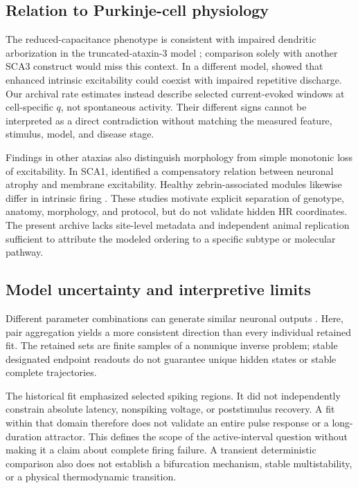 \documentclass[utf8]{FrontiersinHarvard}
\begin{document}
\subsection{Relation to Purkinje-cell physiology}
The reduced-capacitance phenotype is consistent with impaired dendritic arborization in the truncated-ataxin-3 model \citep{konno2014}; comparison solely with another SCA3 construct would miss this context. In a different model, \citet{shakkottai2011} showed that enhanced intrinsic excitability could coexist with impaired repetitive discharge. Our archival rate estimates instead describe selected current-evoked windows at cell-specific $q$, not spontaneous activity. Their different signs cannot be interpreted as a direct contradiction without matching the measured feature, stimulus, model, and disease stage.

Findings in other ataxias also distinguish morphology from simple monotonic loss of excitability. In SCA1, \citet{dellorco2015} identified a compensatory relation between neuronal atrophy and membrane excitability. Healthy zebrin-associated modules likewise differ in intrinsic firing \citep{zhou2014}. These studies motivate explicit separation of genotype, anatomy, morphology, and protocol, but do not validate hidden HR coordinates. The present archive lacks site-level metadata and independent animal replication sufficient to attribute the modeled ordering to a specific subtype or molecular pathway.

\subsection{Model uncertainty and interpretive limits}
Different parameter combinations can generate similar neuronal outputs \citep{prinz2004,achard2006,taylor2009}. Here, pair aggregation yields a more consistent direction than every individual retained fit. The retained sets are finite samples of a nonunique inverse problem; stable designated endpoint readouts do not guarantee unique hidden states or stable complete trajectories.

The historical fit emphasized selected spiking regions. It did not independently constrain absolute latency, nonspiking voltage, or poststimulus recovery. A fit within that domain therefore does not validate an entire pulse response or a long-duration attractor. This defines the scope of the active-interval question without making it a claim about complete firing failure. A transient deterministic comparison also does not establish a bifurcation mechanism, stable multistability, or a physical thermodynamic transition.
\end{document}
